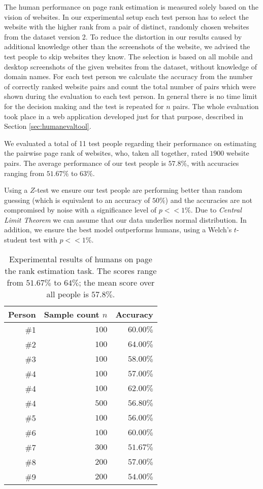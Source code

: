 The human performance on page rank estimation is measured solely based on the vision of websites. In our experimental setup each test person has to select the website with the higher rank from a pair of distinct, randomly chosen websites from the dataset version 2. To reduce the distortion in our results caused by additional knowledge other than the screenshots of the website, we advised the test people to skip websites they know. The selection is based on all mobile and desktop screenshots of the given websites from the dataset, without knowledge of domain names.
For each test person we calculate the accuracy from the number of correctly ranked website pairs and count the total number of pairs which were shown during the evaluation to each test person. In general there is no time limit for the decision making and the test is repeated for $n$ pairs.
The whole evaluation took place in a web application developed just for that purpose, described in Section \ref{sec:humanevaltool}.

We evaluated a total of 11 test people regarding their performance on estimating the pairwise page rank of websites, who, taken all together, rated $1900$ website pairs. The average performance of our test people is $57.8\%$, with accuracies ranging from $51.67\%$ to $63\%$.

Using a $Z$-test we ensure our test people are performing better than random guessing (which is equivalent to an accuracy of $50\%$) and the accuracies are not compromised by noise with a significance level of $p << 1\%$. Due to \textit{Central Limit Theorem} we can assume that our data underlies normal distribution. In addition, we ensure the best model outperforms humans, using a Welch's $t$-student test with $p << 1\%$.

\begin{table}
	\center
	\begin{tabular}{rrr}
		\textbf{Person} & \textbf{Sample count $n$} & \textbf{Accuracy} \\ \hline
		\#1 & $100$ & $60.00\%$\\
		\#2 & $100$ & $64.00\%$\\
		\#3 & $100$ & $58.00\%$\\
        \#4 & $100$ & $57.00\%$\\
        \#4 & $100$ & $62.00\%$\\
        \#4 & $500$ & $56.80\%$\\
		\#5 & $100$ & $56.00\%$\\
		\#6 & $100$ & $60.00\%$\\
		\#7 & $300$ & $51.67\%$\\
		\#8 & $200$ & $57.00\%$\\
		\#9 & $200$ & $54.00\%$\\
	\end{tabular}
	\caption[Experimental results of humans on the page rank estimation task]{Experimental results of humans on page the rank estimation task. The scores range from $51.67\%$ to $64\%$; the mean score over all people is $57.8\%$.}
\label{table_human_eval_results}
\end{table}

